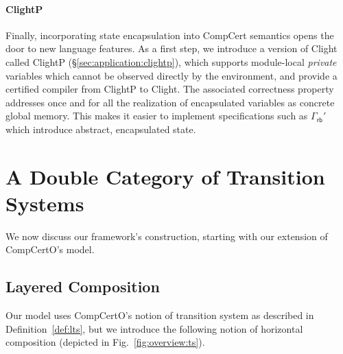 \documentclass[acmsmall,screen,review,anonymous]{acmart}
\newcommand{\kw}[1]{\ensuremath{ \mathsf{#1} }}
\begin{document}

\paragraph{ClightP} \label{sec:overview:clightp} %

Finally,
incorporating state encapsulation
into CompCert semantics
opens the door to new language features.
As a first step,
we introduce a version of Clight called ClightP
(\S\ref{sec:application:clightp}),
which supports module-local \emph{private} variables
which cannot be observed directly by the environment,
and provide a certified compiler from ClightP to Clight.
The associated correctness property
addresses once and for all
the realization of encapsulated variables
as concrete global memory.
This makes it easier to implement specifications such as
$\Gamma_\kw{rb}'$ which introduce abstract, encapsulated state.




\section{A Double Category of Transition Systems} \label{sec:base} %

We now discuss our framework's construction,
starting with our extension of CompCertO's model.

\subsection{Layered Composition} \label{sec:base:ts} %

Our model uses CompCertO's notion of transition system
as described in Definition~\ref{def:lts},
but we introduce the following notion of horizontal composition
(depicted in Fig.~\ref{fig:overview:ts}).
\end{document}
